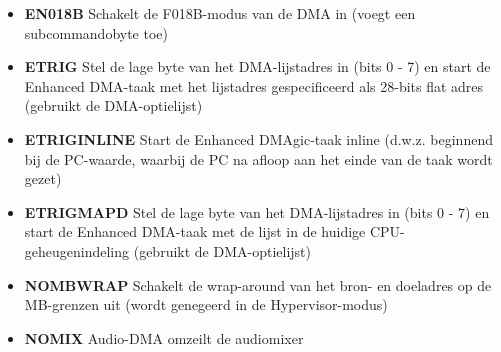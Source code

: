 \begin{itemize}
\item{\bf{EN018B}} Schakelt de F018B-modus van de DMA in (voegt een subcommandobyte toe)
\item{\bf{ETRIG}} Stel de lage byte van het DMA-lijstadres in (bits 0 - 7) en start de Enhanced DMA-taak met het lijstadres gespecificeerd als 28-bits flat adres (gebruikt de DMA-optielijst)
\item{\bf{ETRIGINLINE}} Start de Enhanced DMAgic-taak inline (d.w.z. beginnend bij de PC-waarde, waarbij de PC na afloop aan het einde van de taak wordt gezet)
\item{\bf{ETRIGMAPD}} Stel de lage byte van het DMA-lijstadres in (bits 0 - 7) en start de Enhanced DMA-taak met de lijst in de huidige CPU-geheugenindeling (gebruikt de DMA-optielijst)
\item{\bf{NOMBWRAP}} Schakelt de wrap-around van het bron- en doeladres op de MB-grenzen uit (wordt genegeerd in de Hypervisor-modus)
\item{\bf{NOMIX}} Audio-DMA omzeilt de audiomixer
\end{itemize}
